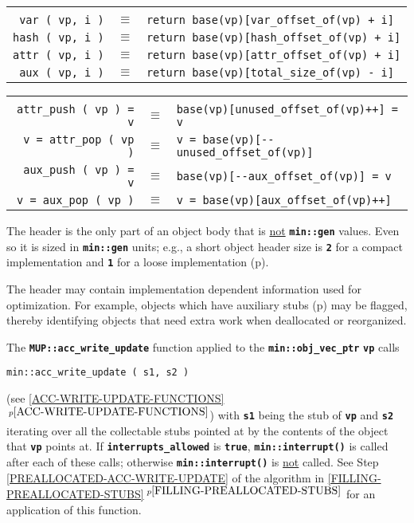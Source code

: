 \documentclass[12pt]{article}
\newcommand{\TT}[1]{{\tt \bfseries #1}}
\newcommand{\itemref}[1]{\ref{#1}$\,^{p\pageref{#1}}$}
\newcommand{\pagref}[1]{p\pageref{#1}}
\newcommand{\EOL}{\penalty \exhyphenpenalty}
\newenvironment{indpar}[1][0.3in]%
	{\begin{list}{}%
		     {\setlength{\itemsep}{0in}%
		      \setlength{\topsep}{0in}%
		      \setlength{\parsep}{1ex}%
		      \setlength{\labelwidth}{#1}%
		      \setlength{\leftmargin}{#1}%
		      \addtolength{\leftmargin}{\labelsep}}%
	 \item}%
	{\end{list}}
\begin{document}
\begin{indpar}\begin{tabular}{rcl}
\hspace*{2.0in} \\[-3ex]
\verb|var ( vp, i )| & $\equiv$
    & \verb|return base(vp)[var_offset_of(vp) + i]| \\
\verb|hash ( vp, i )| & $\equiv$
    & \verb|return base(vp)[hash_offset_of(vp) + i]| \\
\verb|attr ( vp, i )| & $\equiv$
    & \verb|return base(vp)[attr_offset_of(vp) + i]| \\
\verb|aux ( vp, i )| & $\equiv$
    & \verb|return base(vp)[total_size_of(vp) - i]| \\
\end{tabular}\end{indpar}\label{OBJECT-VECTOR-EQUIVALENTS}
\begin{indpar}\begin{tabular}{rcl}
\hspace*{2.0in} \\[-3ex]
\verb|attr_push ( vp ) = v| & $\equiv$
    & \verb|base(vp)[unused_offset_of(vp)++] = v| \\
\verb|v = attr_pop ( vp )| & $\equiv$
    & \verb|v = base(vp)[--unused_offset_of(vp)]| \\
\verb|aux_push ( vp ) = v| & $\equiv$
    & \verb|base(vp)[--aux_offset_of(vp)] = v| \\
\verb|v = aux_pop ( vp )| & $\equiv$
    & \verb|v = base(vp)[aux_offset_of(vp)++]| \\
\end{tabular}\end{indpar}



The header is the only part of an object body that is
\underline{not} \TT{min::gen} values.  Even so it is
sized in \TT{min::gen} units; e.g., a short object header size
is \TT{2} for a compact implementation and \TT{1}
for a loose implementation (\pagref{COMPACT-OR-LOOSE}).

The header may contain implementation dependent information used
for optimization.
For example, objects which have auxiliary stubs
(\pagref{OBJECT-AUXILIARY-STUBS})
may be flagged, thereby identifying objects that need extra work
when deallocated or reorganized.

The \TT{MUP::acc\_write\_update} function applied to the
\TT{min::\EOL obj\_\EOL vec\_\EOL ptr} \TT{vp} calls
\begin{center}
\tt min::\EOL acc\_\EOL write\_\EOL update ( s1, s2 )
\end{center}
(see \itemref{ACC-WRITE-UPDATE-FUNCTIONS}) with \TT{s1} being the
stub of \TT{vp} and \TT{s2} iterating over all the
collectable stubs pointed at by the contents of the object that
\TT{vp} points at.  If \TT{interrupts\_\EOL allowed} is \TT{true},
\TT{min::\EOL interrupt()} is called after each of these calls;
otherwise \TT{min::\EOL interrupt()} is \underline{not}
called.  See Step \ref{PREALLOCATED-ACC-WRITE-UPDATE} of the
algorithm in \itemref{FILLING-PREALLOCATED-STUBS} for an application
of this function.
\end{document}
